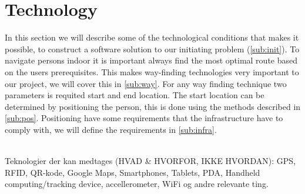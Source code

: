 
\section{Technology}

In this section we will describe some of the technological conditions that makes it possible, to construct a software solution to our initiating problem (\cref{sub:init}).  
To navigate persons indoor it is important always find the most optimal route based on the users prerequisites. This makes way-finding technologies very important to our project, we will cover this in \cref{sub:way}. For any way finding technique two parameters is requited start and end location. The start location can be determined by positioning the person, this is done using the methods described in \cref{sub:pos}.
Positioning have some requirements that the infrastructure have to comply with, we will define the requirements in \cref{sub:infra}. 


\\Teknologier der kan medtages (HVAD & HVORFOR, IKKE HVORDAN): GPS, RFID, QR-kode, Google Maps, Smartphones, Tablets, PDA, Handheld computing/tracking device, accellerometer, WiFi og andre relevante ting.



 


